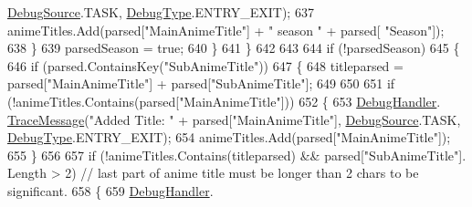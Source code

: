 \begin{DoxyCode}
      \mbox{\hyperlink{namespace_little_weeb_library_1_1_handlers_a2a6ca0775121c9c503d58aa254d292be}{DebugSource}}.TASK, \mbox{\hyperlink{namespace_little_weeb_library_1_1_handlers_ab66019ed40462876ec4e61bb3ccb0a62}{DebugType}}.ENTRY\_EXIT);
637                                             animeTitles.Add(parsed[\textcolor{stringliteral}{"MainAnimeTitle"}] + \textcolor{stringliteral}{" season "} + parsed[\textcolor{stringliteral}{
      "Season"}]);
638                                         \}
639                                         parsedSeason = \textcolor{keyword}{true};
640                                     \}
641                                 \}
642 
643 
644                                 \textcolor{keywordflow}{if} (!parsedSeason)
645                                 \{
646                                     \textcolor{keywordflow}{if} (parsed.ContainsKey(\textcolor{stringliteral}{"SubAnimeTitle"}))
647                                     \{
648                                         titleparsed = parsed[\textcolor{stringliteral}{"MainAnimeTitle"}] + parsed[\textcolor{stringliteral}{"SubAnimeTitle"}];
649 
650 
651                                         \textcolor{keywordflow}{if} (!animeTitles.Contains(parsed[\textcolor{stringliteral}{"MainAnimeTitle"}]))
652                                         \{
653                                             \mbox{\hyperlink{class_little_weeb_library_1_1_handlers_1_1_anime_profile_handler_a0b0ae3c3838d26351485e6dfc566a632}{DebugHandler}}.
      \mbox{\hyperlink{interface_little_weeb_library_1_1_handlers_1_1_i_debug_handler_a2e405bc3492e683cd3702fae125221bc}{TraceMessage}}(\textcolor{stringliteral}{"Added Title: "} + parsed[\textcolor{stringliteral}{"MainAnimeTitle"}], \mbox{\hyperlink{namespace_little_weeb_library_1_1_handlers_a2a6ca0775121c9c503d58aa254d292be}{DebugSource}}.TASK, 
      \mbox{\hyperlink{namespace_little_weeb_library_1_1_handlers_ab66019ed40462876ec4e61bb3ccb0a62}{DebugType}}.ENTRY\_EXIT);
654                                             animeTitles.Add(parsed[\textcolor{stringliteral}{"MainAnimeTitle"}]);
655                                         \}
656 
657                                         \textcolor{keywordflow}{if} (!animeTitles.Contains(titleparsed) && parsed[\textcolor{stringliteral}{"SubAnimeTitle"}].
      Length > 2) \textcolor{comment}{// last part of anime title must be longer than 2 chars to be significant.}
658                                         \{
659                                             \mbox{\hyperlink{class_little_weeb_library_1_1_handlers_1_1_anime_profile_handler_a0b0ae3c3838d26351485e6dfc566a632}{DebugHandler}}.

\end{DoxyCode}
